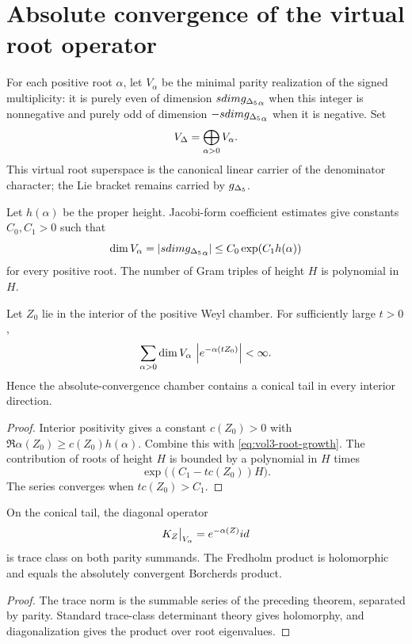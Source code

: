 \chapter{Absolute convergence of the virtual root operator}
For each positive root $\alpha$, let $V_\alpha$ be the minimal parity realization of the signed multiplicity: it is purely even of dimension $sdim{g_{\Delta_5}}_\alpha$ when this integer is nonnegative and purely odd of dimension $-sdim{g_{\Delta_5}}_\alpha$ when it is negative.  Set
\[
 V_\Delta=\bigoplus_{\alpha>0}V_\alpha.
\]
This virtual root superspace is the canonical linear carrier of the denominator character; the Lie bracket remains carried by ${g_{\Delta_5}}$.

Let $h(\alpha)$ be the proper height.  Jacobi-form coefficient estimates give constants $C_0,C_1>0$ such that
\begin{equation}\label{eq:vol3-root-growth}
 \dim V_\alpha=\left|sdim{g_{\Delta_5}}_\alpha\right|\le C_0\exp(C_1h(\alpha))
\end{equation}
for every positive root.  The number of Gram triples of height $H$ is polynomial in $H$.

\begin{theorem}
Let $Z_0$ lie in the interior of the positive Weyl chamber.  For sufficiently large $t>0$,
\[
 \sum_{\alpha>0}\dim V_\alpha\,
 \left|e^{-\alpha(tZ_0)}\right|<\infty.
\]
Hence the absolute-convergence chamber contains a conical tail in every interior direction.
\end{theorem}
\begin{proof}
Interior positivity gives a constant $c(Z_0)>0$ with
$\Re\alpha(Z_0)\ge c(Z_0)h(\alpha)$.
Combine this with \eqref{eq:vol3-root-growth}.  The contribution of roots of height $H$ is bounded by a polynomial in $H$ times
\[
 \exp\bigl((C_1-tc(Z_0))H\bigr).
\]
The series converges when $tc(Z_0)>C_1$.
\end{proof}

\begin{corollary}
On the conical tail, the diagonal operator
\[
 K_Z\big|_{V_\alpha}=e^{-\alpha(Z)}id
\]
is trace class on both parity summands.  The Fredholm product is holomorphic and equals the absolutely convergent Borcherds product.
\end{corollary}
\begin{proof}
The trace norm is the summable series of the preceding theorem, separated by parity.  Standard trace-class determinant theory gives holomorphy, and diagonalization gives the product over root eigenvalues.
\end{proof}


